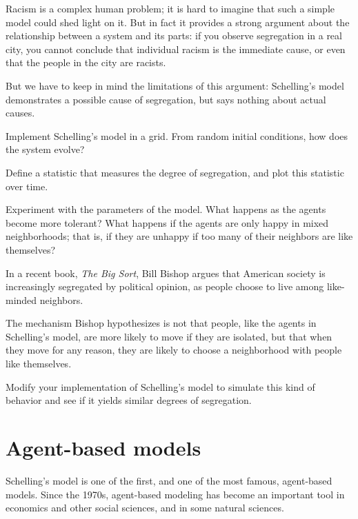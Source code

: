 \documentclass[10pt]{book}
\begin{document}
Racism is a complex human problem; it is hard to imagine that such a
simple model could shed light on it.  But in fact it provides a strong
argument about the relationship between a system and its parts: if you
observe segregation in a real city, you cannot conclude that
individual racism is the immediate cause, or even that the people in
the city are racists.

But we have to keep in mind the limitations of this argument:
Schelling's model demonstrates a possible cause of segregation, but
says nothing about actual causes.

\begin{ex}

Implement Schelling's model in a grid.  From random initial conditions,
how does the system evolve?

Define a statistic that measures the degree of segregation, and plot
this statistic over time.

Experiment with the parameters of the model.  What happens as the agents
become more tolerant?  What happens if the agents are only happy in
mixed neighborhoods; that is, if they are unhappy if too many of their
neighbors are like themselves?

\end{ex}


\begin{ex}

In a recent book, {\em The Big Sort}, Bill Bishop argues that
American society is increasingly segregated by political
opinion, as people choose to live among like-minded neighbors.

The mechanism Bishop hypothesizes is not that people, like the agents
in Schelling's model, are more likely to move if they are
isolated, but that when they move for any reason, they are
likely to choose a neighborhood with people like themselves.

Modify your implementation of Schelling's model to simulate
this kind of behavior and see if it yields similar degrees of
segregation. 

\end{ex}


\section{Agent-based models}

Schelling's model is one of the first, and one of the most
famous, agent-based models.  Since the 1970s, agent-based
modeling has become an important tool in economics and other
social sciences, and in some natural sciences.
\end{document}
